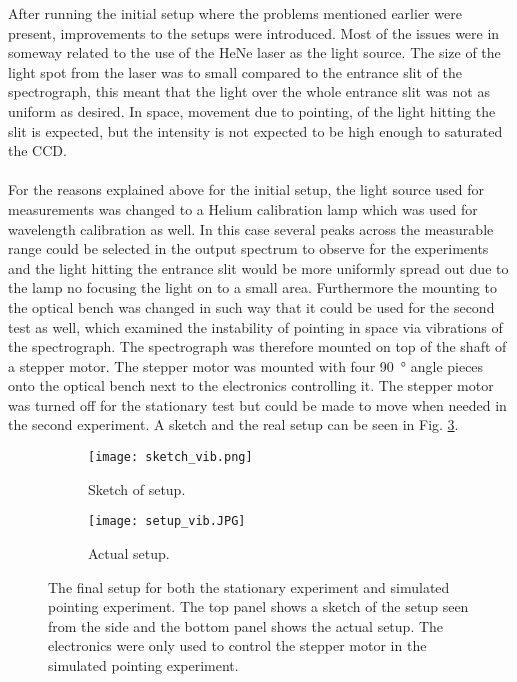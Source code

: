 After running the initial setup where the problems mentioned earlier were present, improvements to the setups were introduced. Most of the issues were in someway related to the use of the HeNe laser as the light source. The size of the light spot from the laser was to small compared to the entrance slit of the spectrograph, this meant that the light over the whole entrance slit was not as uniform as desired. In space, movement due to pointing, of the light hitting the slit is expected, but the intensity is not expected to be high enough to saturated the CCD.
\\
\\
For the reasons explained above for the initial setup, the light source used for measurements was changed to a Helium calibration lamp which was used for wavelength calibration as well. In this case several peaks across the measurable range could be selected in the output spectrum to observe for the experiments and the light hitting the entrance slit would be more uniformly spread out due to the lamp no focusing the light on to a small area. Furthermore the mounting to the optical bench was changed in such way that it could be used for the second test as well, which examined the instability of pointing in space via vibrations of the spectrograph. The spectrograph was therefore mounted on top of the shaft of a stepper motor. The stepper motor was mounted with four \SI{90}{\degree} angle pieces onto the optical bench next to the electronics controlling it. The stepper motor was turned off for the stationary test but could be made to move when needed in the second experiment. A sketch and the real setup can be seen in Fig. \ref{fig: setup_vib_final}.

\begin{figure}[h!]
\centering
\begin{subfigure}{0.8\textwidth}
\texttt{[image: sketch\_vib.png]}
\caption{Sketch of setup.}
\label{fig: Vib_sketch}
\end{subfigure}

\begin{subfigure}{0.8\textwidth}
\texttt{[image: setup\_vib.JPG]}
\caption{Actual setup.}
\label{fig: Vib_setup}
\end{subfigure}
\caption{The final setup for both the stationary experiment and simulated pointing experiment. The top panel shows a sketch of the setup seen from the side and the bottom panel shows the actual setup. The electronics were only used to control the stepper motor in the simulated pointing experiment.}
\label{fig: setup_vib_final}
\end{figure}

